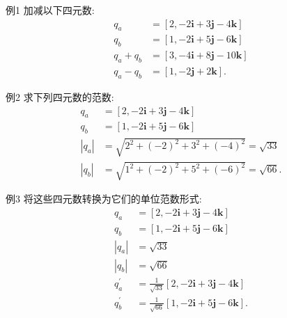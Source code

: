 例1 加减以下四元数:
$$
\begin{aligned}
q_{a} & =[2,-2 \mathbf{i}+3 \mathbf{j}-4 \mathbf{k}] \\
q_{b} & =[1,-2 \mathbf{i}+5 \mathbf{j}-6 \mathbf{k}] \\
q_{a}+q_{b} & =[3,-4 \mathbf{i}+8 \mathbf{j}-10 \mathbf{k}] \\
q_{a}-q_{b} & =[1,-2 \mathbf{j}+2 \mathbf{k}] .
\end{aligned}
$$

例2 求下列四元数的范数:
$$
\begin{aligned}
q_{a} & =[2,-2 \mathbf{i}+3 \mathbf{j}-4 \mathbf{k}] \\
q_{b} & =[1,-2 \mathbf{i}+5 \mathbf{j}-6 \mathbf{k}] \\
\left|q_{a}\right| & =\sqrt{2^{2}+(-2)^{2}+3^{2}+(-4)^{2}}=\sqrt{33} \\
\left|q_{b}\right| & =\sqrt{1^{2}+(-2)^{2}+5^{2}+(-6)^{2}}=\sqrt{66} .
\end{aligned}
$$

例3 将这些四元数转换为它们的单位范数形式:
$$
\begin{aligned}
q_{a} & =[2,-2 \mathbf{i}+3 \mathbf{j}-4 \mathbf{k}] \\
q_{b} & =[1,-2 \mathbf{i}+5 \mathbf{j}-6 \mathbf{k}] \\
\left|q_{a}\right| & =\sqrt{33} \\
\left|q_{b}\right| & =\sqrt{66} \\
q_{a}^{\prime} & =\frac{1}{\sqrt{33}}[2,-2 \mathbf{i}+3 \mathbf{j}-4 \mathbf{k}] \\
q_{b}^{\prime} & =\frac{1}{\sqrt{66}}[1,-2 \mathbf{i}+5 \mathbf{j}-6 \mathbf{k}] .
\end{aligned}
$$

